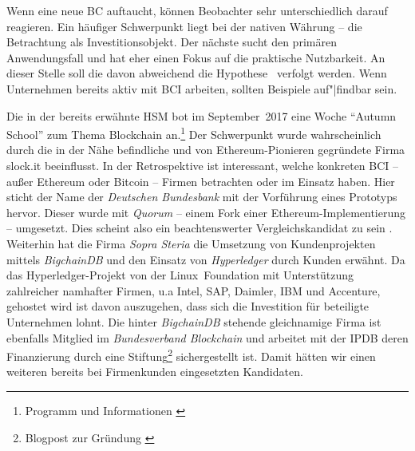 

Wenn eine neue \gls{BC} auftaucht, können Beobachter sehr unterschiedlich darauf reagieren.
Ein häufiger Schwerpunkt liegt bei der nativen Währung -- die Betrachtung als Investitionsobjekt.
Der nächste sucht den primären Anwendungsfall und hat eher einen Fokus auf die praktische Nutzbarkeit.
An dieser Stelle soll die davon abweichend die Hypothese~ verfolgt werden.
Wenn Unternehmen bereits aktiv mit \gls{BCI} arbeiten, sollten Beispiele auf"|findbar sein.

Die in der  bereits erwähnte \gls{HSM} bot im September~2017 eine Woche \enquote{Autumn School} zum Thema Blockchain an.\footnote{Programm und Informationen \autocite{w:hsmw-bccm-as}}
Der Schwerpunkt wurde wahrscheinlich durch die in der Nähe befindliche und von Ethereum-Pionieren gegründete Firma \mbox{slock.it} beeinflusst.
In der Retrospektive ist interessant, welche konkreten \gls{BCI} -- außer Ethereum oder Bitcoin -- Firmen betrachten oder im Einsatz haben.
Hier sticht der Name der \emph{Deutschen Bundesbank} mit der Vorführung eines Prototyps hervor.
Dieser wurde mit \emph{Quorum} -- einem Fork einer Ethereum-Implementierung -- umgesetzt. Dies scheint also ein beachtenswerter Vergleichskandidat zu sein%
.
%
Weiterhin hat die Firma \emph{Sopra Steria} die Umsetzung von Kundenprojekten mittels \emph{BigchainDB} und den Einsatz von \emph{Hyperledger} durch Kunden erwähnt.
Da das Hyperledger-Projekt von der \mbox{Linux Foundation} mit Unterstützung zahlreicher namhafter Firmen, u.a Intel, SAP, Daimler, IBM und Accenture, gehostet wird ist davon auszugehen, dass sich die Investition für beteiligte Unternehmen lohnt.
%
Die hinter \emph{BigchainDB} stehende gleichnamige Firma ist ebenfalls Mitglied im \emph{Bundesverband Blockchain} und arbeitet mit der \gls{IPDB} deren Finanzierung durch eine Stiftung\footnote{Blogpost zur Gründung \autocite{w:ipdb-foundation}} sichergestellt ist.
Damit hätten wir einen weiteren bereits bei Firmenkunden eingesetzten Kandidaten.


